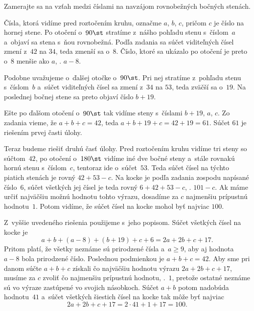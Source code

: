 {%
\napad
Zamerajte sa na vzťah medzi číslami na navzájom rovnobežných bočných stenách.

\riesenie
Čísla, ktorá vidíme pred roztočením kruhu, označme $a$, $b$, $c$, pričom
$c$ je číslo na hornej stene. Po otočení o~$90\st$ stratíme z~nášho pohľadu
stenu s~číslom~$a$ a~objaví sa stena s~ňou rovnobežná. Podľa zadania sa
súčet viditeľných čísel zmení z~$42$ na $34$, teda zmenší sa o~$8$. Číslo, ktoré sa ukázalo po otočení
je preto o~$8$ menšie ako $a$, \tj. $a-8$.

Podobne uvažujeme o~ďalšej otočke o~$90\st$. Pri nej stratíme z~pohľadu stenu
s~číslom~$b$ a~súčet viditeľných čísel sa zmení z~$34$ na $53$, teda zväčší sa
o~$19$. Na poslednej bočnej stene sa preto objaví číslo $b+19$.
%

Ešte po ďalšom otočení o~$90\st$ tak vidíme steny s~číslami $b + 19$, $a$,
$c$. Zo zadania vieme, že $a+ b + c = 42$, teda $a+ b + 19 + c = 42 + 19 =
61$. Súčet $61$ je riešením prvej časti úlohy.

Teraz budeme riešiť druhú časť úlohy. Pred roztočením kruhu vidíme tri steny so súčtom~$42$,
po otočení o~$180\st$ vidíme iné dve bočné steny a~stále rovnakú hornú
stenu s~číslom~$c$, tentoraz ide o~súčet~$53$. Teda súčet čísel na týchto
piatich stenách je rovný $42 + 53 - c$. Na kocke je podľa zadania zospodu
napísané číslo~$6$, súčet všetkých jej čísel je teda rovný $6 + 42 + 53 - c$,
\tj. $101 - c$. Ak máme určiť najväčšiu možnú hodnotu tohto výrazu, dosadíme
za $c$ najmenšiu prípustnú hodnotu~$1$. Potom vidíme, že súčet čísel na
kocke mohol byť najviac $100$.

Z~vyššie uvedeného riešenia použijeme \obr{} s~jeho popisom. Súčet všetkých čísel
na kocke je
$$
a+ b + (a- 8) + (b + 19) + c + 6 = 2a + 2b + c + 17.
$$
Pritom platí, že všetky neznáme sú prirodzené čísla a~$a\ge9$, aby aj hodnota $a- 8$ bola prirodzené číslo. Poslednou podmienkou je $a+ b + c =
42$. Aby sme pri danom súčte $a+ b + c$ získali čo najväčšiu hodnotu výrazu
$2a + 2b + c + 17$, musíme za $c$ zvoliť čo najmenšiu prípustnú hodnotu, \tj.~$1$,
pretože ostatné neznáme sú vo výraze zastúpené vo svojich násobkoch. Súčet $a+ b$ potom
nadobúda hodnotu~$41$ a~súčet všetkých šiestich čísel na kocke tak môže byť najviac
$$
2a + 2b + c + 17 = 2\cdot 41 + 1 + 17 = 100.
$$
}

